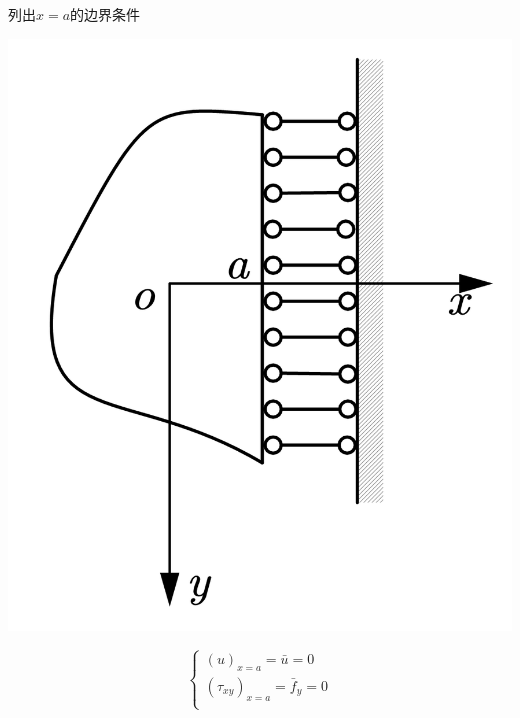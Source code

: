 \begin{example}
	列出$x=a$的边界条件
\end{example}
\centerline{\includegraphics[scale=0.4]{figure/2-15.png}}
\begin{remark}
	\[\begin{cases}
	\left( u \right) _{x=a}=\bar{u}=0\\
	\left( \tau _{xy} \right) _{x=a}=\bar{f}_y=0\\
	\end{cases}\]
\end{remark}

